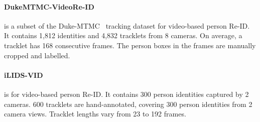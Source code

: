 \documentclass[a4paper,fleqn]{cas-dc}
\begin{document}
\paragraph{DukeMTMC-VideoRe-ID~\cite{wu_exploit_2018}}  is a subset of the Duke-MTMC~\cite{ristani_performance_2016} tracking dataset for video-based person Re-ID. It contains 1,812 identities and 4,832 tracklets from 8 cameras. On average, a tracklet has 168 consecutive frames. The person boxes in the frames are manually cropped and labelled.

\paragraph{iLIDS-VID~\cite{wang_person_2014}} is for video-based person Re-ID. It contains 300 person identities captured by 2 cameras. 600 tracklets are hand-annotated, covering 300 person identities from 2 camera views. Tracklet lengths vary from 23 to 192 frames.
\end{document}
